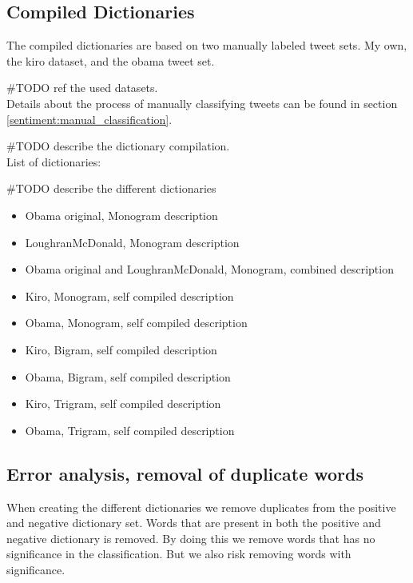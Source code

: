 \subsection{Compiled Dictionaries}
The compiled dictionaries are based on two manually labeled tweet sets. My own,
the kiro dataset, and the obama tweet set.
 
#TODO ref the used datasets.\\ 

Details about the process of manually classifying tweets can be found in section
\ref{sentiment:manual_classification}.

#TODO describe the dictionary compilation.\\


List of dictionaries:

#TODO describe the different dictionaries\\ 
\begin{itemize}
    \item Obama original, Monogram 
	\subitem description

    \item LoughranMcDonald, Monogram 
	\subitem description

    \item Obama original and LoughranMcDonald, Monogram, combined
	\subitem description

    \item Kiro, Monogram, self compiled 
	\subitem description

    \item Obama, Monogram, self compiled 
	\subitem description

    \item Kiro, Bigram, self compiled 
	\subitem description

    \item Obama, Bigram, self compiled 
	\subitem description

    \item Kiro, Trigram, self compiled 
	\subitem description

    \item Obama, Trigram, self compiled 
	\subitem description
	\label{data:dictionary_list}
\end{itemize}
%

\subsection{Error analysis, removal of duplicate words}
When creating the different dictionaries we remove duplicates from the positive
and negative dictionary set. Words that are present in both the positive and
negative dictionary is removed. By doing this we remove words that has no
significance in the classification. But we also risk removing words with
significance.

